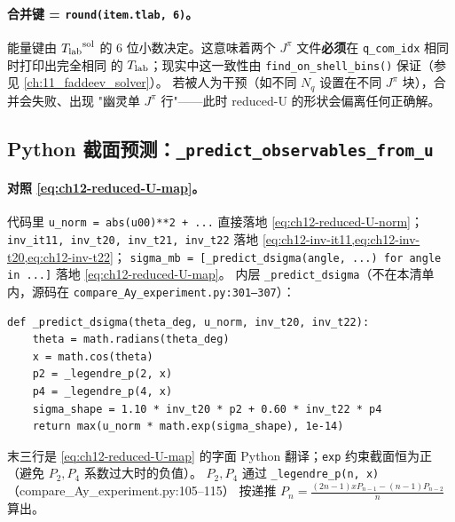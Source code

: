 \paragraph{合并键 = \texttt{round(item.tlab, 6)}。}
能量键由 \({T_{\text{lab}}}^{\rm sol}\) 的 6 位小数决定。这意味着两个
\(J^\pi\) 文件\textbf{必须}在 \texttt{q\_com\_idx} 相同时打印出完全相同
的 \({T_{\text{lab}}}\)；现实中这一致性由 \texttt{find\_on\_shell\_bins()} 保证（参见
\cref{ch:11_faddeev_solver}）。
若被人为干预（如不同 \(N_q\) 设置在不同 \(J^\pi\) 块），合并会失败、出现
"幽灵单 \(J^\pi\) 行"——此时 reduced-U 的形状会偏离任何正确解。

\subsection{Python 截面预测：\texttt{\_predict\_observables\_from\_u}}
\label{subsec:ch12-predict-py}



\paragraph{对照 \cref{eq:ch12-reduced-U-map}。}
代码里 \texttt{u\_norm = abs(u00)**2 + ...} 直接落地
\cref{eq:ch12-reduced-U-norm}；
\texttt{inv\_it11, inv\_t20, inv\_t21, inv\_t22} 落地
\cref{eq:ch12-inv-it11,eq:ch12-inv-t20,eq:ch12-inv-t22}；
\texttt{sigma\_mb = [\_predict\_dsigma(angle, ...) for angle in ...]} 落地
\cref{eq:ch12-reduced-U-map}。
内层 \texttt{\_predict\_dsigma}（不在本清单内，源码在 \texttt{compare\_Ay\_experiment.py:301--307}）：

\begin{lstlisting}[style=python, caption={\_predict\_dsigma 内核（compare\_Ay\_experiment.py:301--307）}, label={lst:ch12-predict-dsigma}]
def _predict_dsigma(theta_deg, u_norm, inv_t20, inv_t22):
    theta = math.radians(theta_deg)
    x = math.cos(theta)
    p2 = _legendre_p(2, x)
    p4 = _legendre_p(4, x)
    sigma_shape = 1.10 * inv_t20 * p2 + 0.60 * inv_t22 * p4
    return max(u_norm * math.exp(sigma_shape), 1e-14)
\end{lstlisting}

末三行是 \cref{eq:ch12-reduced-U-map} 的字面 Python 翻译；\texttt{exp}
约束截面恒为正（避免 \(P_2, P_4\) 系数过大时的负值）。
\(P_2, P_4\) 通过 \texttt{\_legendre\_p(n, x)}（compare\_Ay\_experiment.py:105--115）
按递推
\(P_n = \tfrac{(2n-1) x P_{n-1} - (n-1) P_{n-2}}{n}\) 算出。

